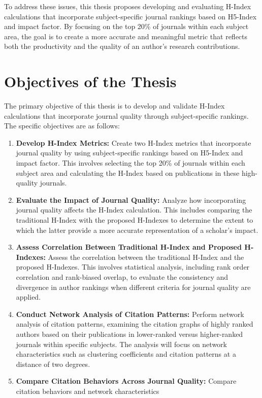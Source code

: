 To address these issues, this thesis proposes developing and evaluating H-Index calculations that incorporate subject-specific 
journal rankings based on H5-Index and impact factor. By focusing on the top 20\% of journals within each subject area, 
the goal is to create a more accurate and meaningful metric that reflects both the productivity and the quality of an author's research contributions.

\section{Objectives of the Thesis}
The primary objective of this thesis is to develop and validate H-Index calculations that incorporate journal quality through subject-specific rankings. The specific objectives are as follows:
\begin{enumerate}
    \item \textbf{Develop H-Index Metrics:} Create two H-Index metrics that incorporate journal quality
     by using subject-specific rankings based on H5-Index and impact factor.
      This involves selecting the top 20\% of journals within each subject area and calculating the H-Index based on publications
      in these high-quality journals.
    \item \textbf{Evaluate the Impact of Journal Quality:} Analyze how incorporating journal quality affects the H-Index calculation.
    This includes comparing the traditional H-Index with the proposed H-Indexes to determine the extent to which the latter
    provide a more accurate representation of a scholar’s impact.
    \item \textbf{Assess Correlation Between Traditional H-Index and Proposed H-Indexes:} Assess the correlation between the traditional H-Index
    and the proposed H-Indexes. This involves statistical analysis, including rank order correlation
    and rank-biased overlap, to evaluate the consistency and divergence in author rankings when different criteria for journal quality are applied.
    \item \textbf{Conduct Network Analysis of Citation Patterns:} Perform network analysis of citation patterns,
    examining the citation graphs of highly ranked authors based on their publications in lower-ranked versus
    higher-ranked journals within specific subjects. The analysis will focus on network characteristics such as
    clustering coefficients and citation patterns at a distance of two degrees.
    \item \textbf{Compare Citation Behaviors Across Journal Quality:} Compare citation behaviors and network characteristics

\end{enumerate}
